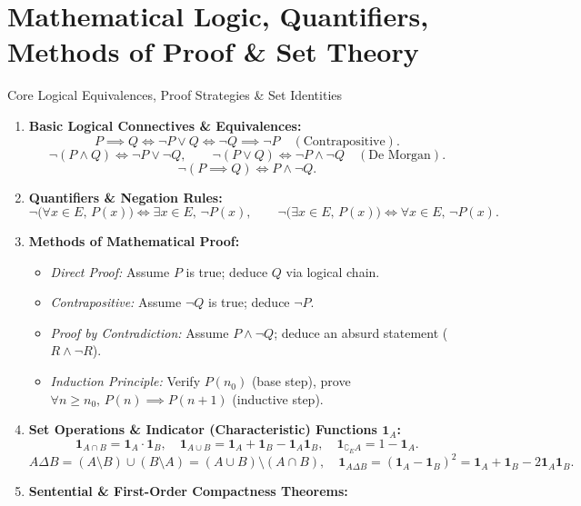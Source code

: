 \chapter{Mathematical Logic, Quantifiers, Methods of Proof \& Set Theory}
\label{chap:exo_ch01}

\begin{quicksummary}{Core Logical Equivalences, Proof Strategies \& Set Identities}
\begin{enumerate}[leftmargin=1.4em,itemsep=3pt]
  \item \textbf{Basic Logical Connectives \& Equivalences:}
  \[
  P \implies Q \iff \neg P \lor Q \iff \neg Q \implies \neg P \quad (\text{Contrapositive}).
  \]
  \[
  \neg(P \land Q) \iff \neg P \lor \neg Q, \qquad \neg(P \lor Q) \iff \neg P \land \neg Q \quad (\text{De Morgan}).
  \]
  \[
  \neg(P \implies Q) \iff P \land \neg Q.
  \]
  \item \textbf{Quantifiers \& Negation Rules:}
  \[
  \neg\bigl(\forall x \in E,\, P(x)\bigr) \iff \exists x \in E,\, \neg P(x), \qquad
  \neg\bigl(\exists x \in E,\, P(x)\bigr) \iff \forall x \in E,\, \neg P(x).
  \]
  \item \textbf{Methods of Mathematical Proof:}
  \begin{itemize}[leftmargin=1.2em,itemsep=1pt]
    \item \textit{Direct Proof:} Assume $P$ is true; deduce $Q$ via logical chain.
    \item \textit{Contrapositive:} Assume $\neg Q$ is true; deduce $\neg P$.
    \item \textit{Proof by Contradiction:} Assume $P \land \neg Q$; deduce an absurd statement ($R \land \neg R$).
    \item \textit{Induction Principle:} Verify $P(n_0)$ (base step), prove $\forall n \ge n_0,\, P(n) \implies P(n+1)$ (inductive step).
  \end{itemize}
  \item \textbf{Set Operations \& Indicator (Characteristic) Functions $\mathbf{1}_A$:}
  \[
  \mathbf{1}_{A \cap B} = \mathbf{1}_A \cdot \mathbf{1}_B, \quad \mathbf{1}_{A \cup B} = \mathbf{1}_A + \mathbf{1}_B - \mathbf{1}_A \mathbf{1}_B, \quad \mathbf{1}_{\complement_E A} = 1 - \mathbf{1}_A.
  \]
  \[
  A \Delta B = (A \setminus B) \cup (B \setminus A) = (A \cup B) \setminus (A \cap B), \quad \mathbf{1}_{A \Delta B} = (\mathbf{1}_A - \mathbf{1}_B)^2 = \mathbf{1}_A + \mathbf{1}_B - 2\mathbf{1}_A \mathbf{1}_B.
  \]
  \item \textbf{Sentential \& First-Order Compactness Theorems:}

\end{enumerate}
\end{quicksummary}
